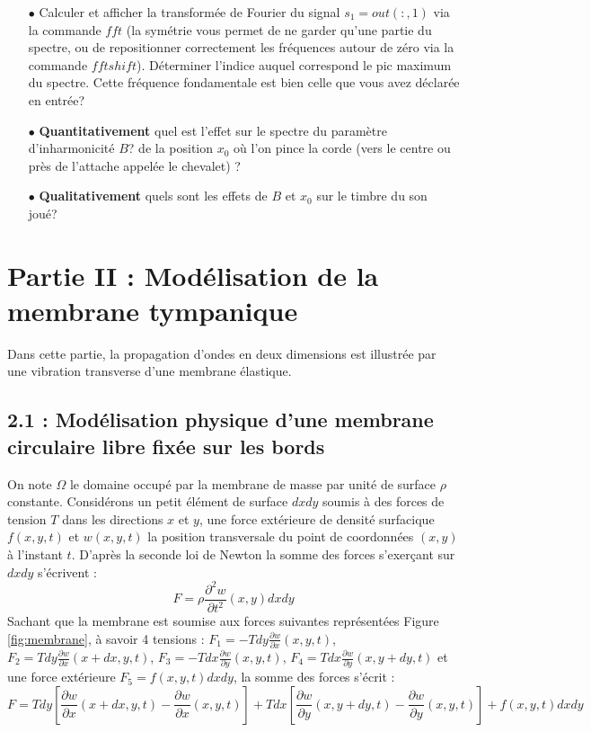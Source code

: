 \documentclass[a4,12pt]{article}
\begin{document}
	    \begin{itemize}
	      \item[$\bullet$] Calculer et afficher la transformée de Fourier du signal $s_1=out(:,1)$ via la commande $fft$ 	(la symétrie vous permet de ne garder qu'une partie du spectre, ou de repositionner correctement les 		fréquences autour de zéro via la commande $fftshift$). Déterminer l'indice auquel correspond le pic maximum 	du spectre. Cette fréquence fondamentale est bien celle que vous avez déclarée en entrée?\\ 
	      \item[$\bullet$] \textbf{Quantitativement} quel est l'effet sur le spectre du paramètre d'inharmonicité $B$? de 	la position $x_0$ où l'on pince la corde (vers le centre ou près de l'attache appelée le chevalet) ? \\ 
	      \item[$\bullet$] \textbf{Qualitativement} quels sont les effets de $B$ et $x_0$ sur le timbre du son joué?\end{itemize} 


	    \newpage


	    \section*{Partie II : Modélisation de la membrane tympanique}

	    Dans cette partie, la propagation d'ondes en deux dimensions est illustrée par une vibration transverse d'une membrane élastique.

	    \subsection*{2.1 : Modélisation physique d'une membrane circulaire libre fixée sur les bords}

	    On note $\Omega$ le domaine occupé par la membrane de masse par unité de surface $\rho$ constante. Considérons un petit élément de surface $dxdy$ soumis à des forces de tension $T$  dans les directions $x$ et $y$, une force extérieure de densité surfacique $f(x,y,t)$ et $w(x,y,t)$ la position transversale du point de coordonnées $(x,y)$ à l'instant $t$. D'après la seconde loi de Newton la somme des forces s'exerçant sur $dxdy$ s'écrivent : 
	    \[
	      F=\rho  \frac{\partial^2 w}{\partial t^2}(x,y)dxdy
	    \]
	    Sachant que la membrane est soumise aux forces suivantes représentées Figure \ref{fig:membrane}, à savoir 4 tensions : $F_1=-Tdy\frac{\partial w}{\partial x}(x,y,t)$, $F_2=Tdy\frac{\partial w}{\partial x}(x+dx,y,t)$, $F_3=-Tdx\frac{\partial w}{\partial y}(x,y,t)$, $F_4=Tdx\frac{\partial w}{\partial y}(x,y+dy,t)$ et une force extérieure $F_5=f(x,y,t)dxdy$, la somme des forces s'écrit : 
	    \[
	      F=Tdy\left[\frac{\partial w}{\partial x}(x+dx,y,t)-\frac{\partial w}{\partial x}(x,y,t)\right]+Tdx\left[\frac{\partial w}{\partial y}(x,y+dy,t)-\frac{\partial w}{\partial y}(x,y,t)\right]+f(x,y,t)dxdy
	    \]
\end{document}
